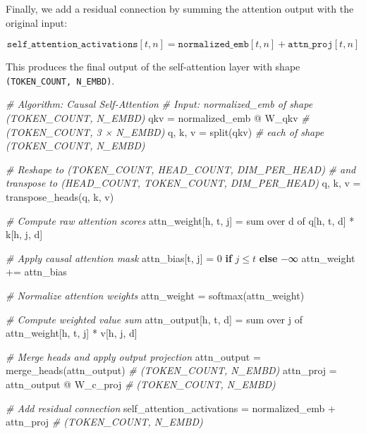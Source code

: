 \documentclass[11pt]{article}
\newenvironment{Shaded}{}{}
\newcommand{\DecValTok}[1]{\textcolor[rgb]{0.25,0.63,0.44}{{#1}}}
\newcommand{\CommentTok}[1]{\textcolor[rgb]{0.38,0.63,0.69}{\textit{{#1}}}}
\newcommand{\NormalTok}[1]{{#1}}
\newcommand{\ControlFlowTok}[1]{\textcolor[rgb]{0.00,0.44,0.13}{\textbf{{#1}}}}
\newcommand{\OperatorTok}[1]{\textcolor[rgb]{0.40,0.40,0.40}{{#1}}}
\newcommand{\BuiltInTok}[1]{{#1}}
\begin{document}
Finally, we add a residual connection by summing the attention output
with the original input:

\[
\texttt{self\_attention\_activations}[t, n] = \texttt{normalized\_emb}[t, n] + \texttt{attn\_proj}[t, n]
\]

This produces the final output of the self-attention layer with shape
\texttt{(TOKEN\_COUNT,\ N\_EMBD)}.

\begin{Shaded}
\begin{Highlighting}[]
\CommentTok{\# Algorithm: Causal Self{-}Attention}
\CommentTok{\# Input: normalized\_emb of shape (TOKEN\_COUNT, N\_EMBD)}
\NormalTok{qkv }\OperatorTok{=}\NormalTok{ normalized\_emb }\OperatorTok{@}\NormalTok{ W\_qkv              }\CommentTok{\# (TOKEN\_COUNT, 3 × N\_EMBD)}
\NormalTok{q, k, v }\OperatorTok{=}\NormalTok{ split(qkv)                      }\CommentTok{\# each of shape (TOKEN\_COUNT, N\_EMBD)}

\CommentTok{\# Reshape to (TOKEN\_COUNT, HEAD\_COUNT, DIM\_PER\_HEAD) }
\CommentTok{\# and transpose to (HEAD\_COUNT, TOKEN\_COUNT, DIM\_PER\_HEAD)}
\NormalTok{q, k, v }\OperatorTok{=}\NormalTok{ transpose\_heads(q, k, v)}

\CommentTok{\# Compute raw attention scores}
\NormalTok{attn\_weight[h, t, j] }\OperatorTok{=} \BuiltInTok{sum}\NormalTok{ over d of q[h, t, d] }\OperatorTok{*}\NormalTok{ k[h, j, d]}

\CommentTok{\# Apply causal attention mask}
\NormalTok{attn\_bias[t, j] }\OperatorTok{=} \DecValTok{0} \ControlFlowTok{if} \NormalTok{\( j \leq t \)}
\ControlFlowTok{else}\NormalTok{ −∞}
\NormalTok{attn\_weight }\OperatorTok{+=}\NormalTok{ attn\_bias}

\CommentTok{\# Normalize attention weights}
\NormalTok{attn\_weight }\OperatorTok{=}\NormalTok{ softmax(attn\_weight)}

\CommentTok{\# Compute weighted value sum}
\NormalTok{attn\_output[h, t, d] }\OperatorTok{=} \BuiltInTok{sum}\NormalTok{ over j of attn\_weight[h, t, j] }\OperatorTok{*}\NormalTok{ v[h, j, d]}

\CommentTok{\# Merge heads and apply output projection}
\NormalTok{attn\_output }\OperatorTok{=}\NormalTok{ merge\_heads(attn\_output)    }\CommentTok{\# (TOKEN\_COUNT, N\_EMBD)}
\NormalTok{attn\_proj }\OperatorTok{=}\NormalTok{ attn\_output }\OperatorTok{@}\NormalTok{ W\_c\_proj        }\CommentTok{\# (TOKEN\_COUNT, N\_EMBD)}

\CommentTok{\# Add residual connection}
\NormalTok{self\_attention\_activations }\OperatorTok{=}\NormalTok{ normalized\_emb }\OperatorTok{+}\NormalTok{ attn\_proj            }\CommentTok{\# (TOKEN\_COUNT, N\_EMBD)}
\end{Highlighting}
\end{Shaded}
\end{document}
